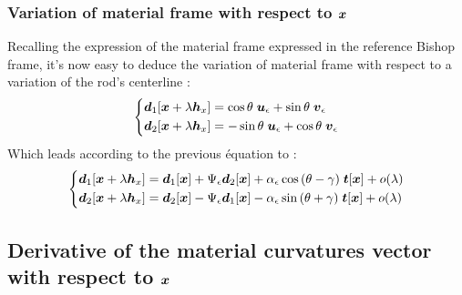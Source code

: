 \subsubsection{Variation of material frame with respect to $\boldsymbol{x}$}
Recalling the expression of the material frame expressed in the reference Bishop frame, it's now easy to deduce the variation of material frame with respect to a variation of the rod's centerline :
\begin{equation}
	\left\{
		\begin{aligned}
			&\boldsymbol{d}_1[\boldsymbol{x}+\lambda \boldsymbol{h}_x] = 
			\cos{\theta} \; \boldsymbol{u}_\epsilon + \sin{\theta} \; \boldsymbol{v}_\epsilon\\
			&\boldsymbol{d}_2[\boldsymbol{x}+\lambda \boldsymbol{h}_x] = 
			-\sin{\theta} \; \boldsymbol{u}_\epsilon + \cos{\theta} \; \boldsymbol{v}_\epsilon\\
		\end{aligned}
	\right.
\end{equation}
Which leads according to the previous équation to :
\begin{equation}
	\left\{
		\begin{aligned}
			&\boldsymbol{d}_1[\boldsymbol{x}+\lambda \boldsymbol{h}_x] = \boldsymbol{d}_1[\boldsymbol{x}] + \Psi_\epsilon\boldsymbol{d}_2[\boldsymbol{x}]
			+ \alpha_\epsilon\cos{(\theta-\gamma)}\;\boldsymbol{t}[\boldsymbol{x}] + o(\lambda) \\
			&\boldsymbol{d}_2[\boldsymbol{x}+\lambda \boldsymbol{h}_x] = \boldsymbol{d}_2[\boldsymbol{x}] - \Psi_\epsilon\boldsymbol{d}_1[\boldsymbol{x}]
			- \alpha_\epsilon\sin{(\theta+\gamma)}\;\boldsymbol{t}[\boldsymbol{x}] + o(\lambda) \\
		\end{aligned}
	\right.
\end{equation}

\subsection{Derivative of the material curvatures vector with respect to $\boldsymbol{x}$}

